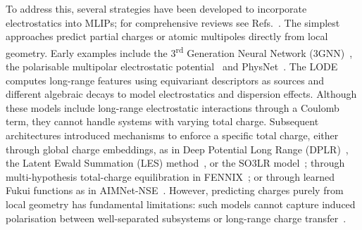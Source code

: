 \documentclass[aps,%
superscriptaddress,
 amsmath,amssymb,
floatfix,
twocolumn
]{revtex4-2}
\begin{document}
To address this, several strategies have been developed to incorporate electrostatics into MLIPs; for comprehensive reviews see Refs.~\cite{Olexandr_lr_review, behler_4gnn_review_2021, Baldwin2026SCF, grasselli2026longrangeelectrostaticsatomisticmachine}. The simplest approaches predict partial charges or atomic multipoles directly from local geometry. Early examples include the 3\textsuperscript{rd} Generation Neural Network (3GNN)~\cite{Morawietz2012ACharges, Artrith2011}, the polarisable multipolar electrostatic potential~\cite{Mills2011} and PhysNet~\cite{physnet2019}. The LODE~\cite{Grisafi2019} computes long-range features using equivariant descriptors as sources and different algebraic decays to model electrostatics and dispersion effects.
Although these models include long-range electrostatic interactions through a Coulomb term, they cannot handle systems with varying total charge. Subsequent architectures introduced mechanisms to enforce a specific total charge, either through global charge embeddings, as in Deep Potential Long Range (DPLR)~\cite{Zhang2022AInteractions, Zhang2024}, the Latent Ewald Summation (LES) method~\cite{Cheng2025}, or the SO3LR model~\cite{Kabylda2025}; through multi-hypothesis total-charge equilibration in FENNIX~\cite{Pl__2023, PL_2025}; or through learned Fukui functions as in AIMNet-NSE~\cite{aimnetnse}. However, predicting charges purely from local geometry has fundamental limitations: such models cannot capture induced polarisation between well-separated subsystems or long-range charge transfer~\cite{behler_4gnn_review_2021, kocer2024machinelearningpotentialsredox}.
\end{document}
